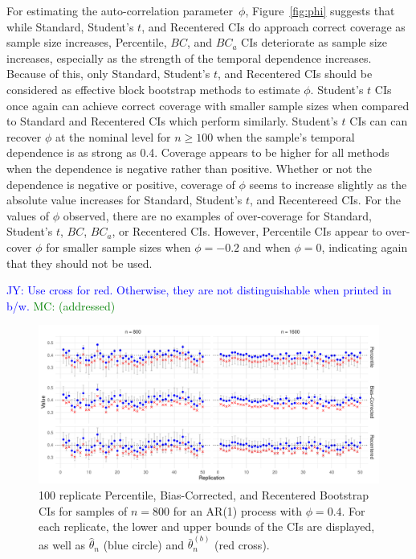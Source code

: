 \documentclass[12pt, letterpaper, titlepage]{article}
\newcommand{\jy}[1]{\textcolor{blue}{JY: #1}}
\newcommand{\mc}[1]{\textcolor{green}{MC: (#1)}}
\begin{document}
For estimating the auto-correlation parameter~$\phi$, Figure~\ref{fig:phi}
suggests that while Standard, Student's $t$, and Recentered CIs do
approach correct coverage as sample size increases, Percentile, $BC$, and
$BC_a$ CIs deteriorate as sample size increases, especially as the strength of
the temporal dependence increases. Because of this, only Standard, Student's
$t$, and Recentered CIs should be considered as effective block bootstrap
methods to estimate $\phi$. Student's $t$ CIs once again can achieve correct
coverage with smaller sample sizes when compared to Standard and Recentered CIs
which perform similarly. Student's $t$ CIs can can recover $\phi$ at the
nominal level for $n \geq 100$ when the sample's temporal dependence is as
strong as 0.4. Coverage appears to be higher for all methods when the
dependence is negative rather than positive. Whether or not the dependence is
negative or positive, coverage of $\phi$ seems to increase slightly as the
absolute value increases for Standard, Student's $t$, and Recentereed CIs. For the
values of $\phi$ observed, there are no examples
of over-coverage for Standard, Student's $t$, $BC$, $BC_a$, or Recentered CIs.
However, Percentile CIs appear to over-cover $\phi$ for smaller sample sizes when 
$\phi = -0.2$ and when $\phi = 0$, indicating again that they should not be used.

\jy{Use cross for red. Otherwise, they are not distinguishable when printed in b/w.}
\mc{addressed}

\begin{figure}[tbp]
  \centering
  \includegraphics[width=\textwidth]{figures/norm_phi_intervals}
  \caption{100 replicate Percentile, Bias-Corrected, and Recentered
    Bootstrap CIs for samples of $n = 800$ for an AR(1) process with
    $\phi = 0.4$. For each replicate, the lower and upper bounds of the CIs
    are displayed, as well as $\hat\theta_n$ (blue circle) and
    $\bar\theta_n^{(b)}$ (red cross). }
  \label{fig:npi}
\end{figure}
\end{document}
